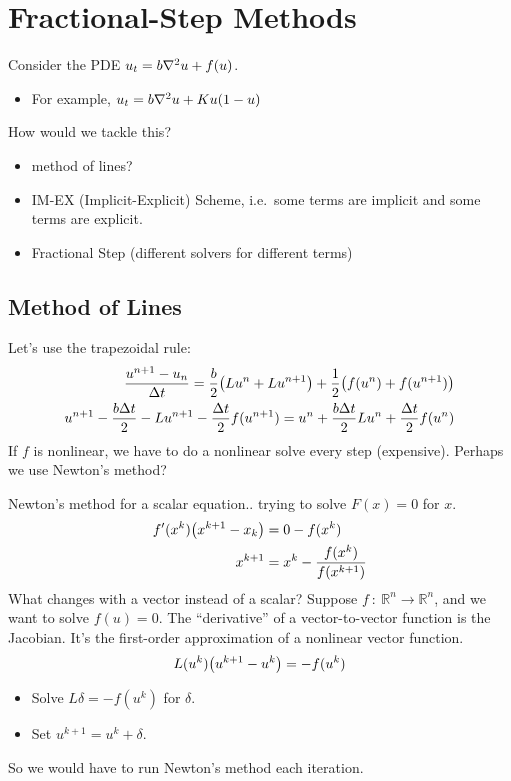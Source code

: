 \documentclass{article}
\newcommand{\Rl}{\mathbb{R}}
\newcommand{\f}[3]{#1\ :\ #2 \rightarrow #3}
\newcommand{\Dt}{\Delta t}
\begin{document}
    \section{Fractional-Step Methods}
        Consider the PDE $u_t = b\laplacian u + f(u)$.
        \begin{itemize}
            \item For example, $u_t = b\laplacian u + Ku(1 - u)$
        \end{itemize}
        How would we tackle this?
        \begin{itemize}
            \item method of lines?
            \item IM-EX (Implicit-Explicit) Scheme, i.e.~some terms are implicit and some terms are explicit.
            \item Fractional Step (different solvers for different terms)
        \end{itemize}

        \subsection{Method of Lines}
            Let's use the trapezoidal rule:
            \begin{align*}
                \frac{u^{n+1} - u_n}{\Dt} = \frac{b}{2}\qty(Lu^n + Lu^{n+1}) + \frac{1}{2}\qty(f(u^n) + f(u^{n+1})) \\
                u^{n+1} - \frac{b\Dt}{2} - Lu^{n+1} - \frac{\Dt}{2}f(u^{n+1})= u^n + \frac{b\Dt}{2}Lu^n + \frac{\Dt}{2}f(u^n)
            \end{align*}
            If $f$ is nonlinear, we have to do a nonlinear solve every step (expensive).  Perhaps we use Newton's method?
            \begin{adjustwidth}{2cm}{4cm}
                Newton's method for a scalar equation.. trying to solve $F(x) = 0$ for $x$.
                \begin{align*}
                    f'(x^k)\qty(x^{k+1} - x_k) &= 0 - f(x^k) \\
                    x^{k+1} &= x^k - \frac{f(x^k)}{f(x^{k+1})}
                \end{align*}
                What changes with a vector instead of a scalar?  Suppose $\f{f}{\Rl^n}{\Rl^n}$, and we want to solve $f(u) = 0$.  The ``derivative'' of a vector-to-vector function is the Jacobian.  It's the first-order approximation of a nonlinear vector function.
                \begin{align*}
                    L(u^k)\qty(u^{k+1} - u^k) = -f(u^k)
                \end{align*}
                \begin{itemize}
                    \item Solve $L\delta = -f(u^{k})$ for $\delta$.
                    \item Set $u^{k+1} = u^k + \delta$.
                \end{itemize}
            \end{adjustwidth}
            So we would have to run Newton's method each iteration.
\end{document}
